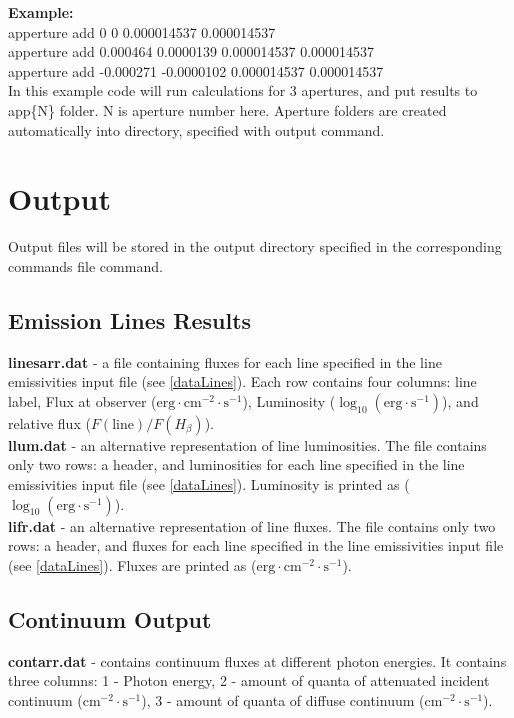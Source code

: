 \documentclass[a4paper]{article}
\begin{document}
{\bf Example:}\\
apperture add 0 0 0.000014537 0.000014537\\
apperture add 0.000464 0.0000139 0.000014537 0.000014537\\
apperture add -0.000271 -0.0000102 0.000014537 0.000014537\\
In this example code will run calculations for 3 apertures, and put results to 
app\{N\} folder. N is aperture number here. Aperture folders are created automatically
into directory, specified with output command.

\section{Output}
Output files will be stored in the output directory specified in the corresponding commands file command.

\subsection{Emission Lines Results}
{\bf linesarr.dat} - a file containing fluxes for each line specified in the line emissivities input file (see \ref{dataLines}).
Each row contains four columns: line label, Flux at observer ($\mathrm{erg} \cdot \mathrm{cm}^{-2} \cdot \mathrm{s}^{-1}$), Luminosity ($\log_{10}(\mathrm{erg} \cdot \mathrm{s}^{-1})$),
and relative flux ($F(\text{line})/F(H_{\beta})$).\\
{\bf llum.dat} - an alternative representation of line luminosities. The file contains only two rows: a header, and luminosities for each line specified in the line emissivities input file (see \ref{dataLines}).
Luminosity is printed as ($\log_{10}(\mathrm{erg} \cdot \mathrm{s}^{-1})$). \\
{\bf lifr.dat} - an alternative representation of line fluxes. The file contains only two rows: a header, and fluxes for each line specified in the line emissivities input file (see \ref{dataLines}).
Fluxes are printed as ($\mathrm{erg} \cdot \mathrm{cm}^{-2} \cdot \mathrm{s}^{-1}$).

\subsection{Continuum Output}
{\bf contarr.dat} - contains continuum fluxes at different photon energies. It contains three columns:
1 - Photon energy, 2 - amount of quanta of attenuated incident continuum ($\mathrm{cm}^{-2} \cdot \mathrm{s}^{-1}$), 3 - amount of quanta of diffuse continuum ($\mathrm{cm}^{-2} \cdot \mathrm{s}^{-1}$).\\
\end{document}
